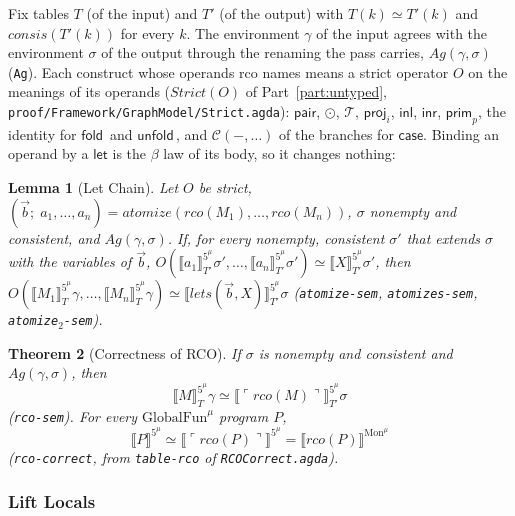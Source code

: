 \documentclass[10pt]{article}
\theoremstyle{acmplain}
\newtheorem{theorem}{Theorem}[section]
\newtheorem{lemma}[theorem]{Lemma}
\newcommand{\SEM}[1]{\llbracket #1 \rrbracket}
\newcommand{\key}[1]{\mathsf{#1}}
\newcommand{\pass}[1]{\mathit{#1}}
\newcommand{\consis}{\mathit{consis}}
\newcommand{\Tembed}[1]{\ulcorner #1 \urcorner}  %
\newcommand{\Ml}[1]{\textrm{#1}^{\mu}}                  %
\newcommand{\Mfold}{\key{fold}\,}
\newcommand{\Munfold}{\key{unfold}\,}
\begin{document}
Fix tables $T$ (of the input) and $T'$ (of the output) with
$T(k) \simeq T'(k)$ and $\consis(T'(k))$ for every $k$. The environment
$\gamma$ of the input agrees with the environment $\sigma$ of the output
through the renaming the pass carries, $\mathit{Ag}(\gamma, \sigma)$
(\texttt{Ag}). Each construct whose operands rco names means a strict
operator $O$ on the meanings of its operands ($\mathit{Strict}(O)$ of
Part~\ref{part:untyped}, \texttt{proof/Framework/GraphModel/Strict.agda}):
$\key{pair}$, $\odot$, $\mathcal{T}$, $\key{proj}_i$, $\key{inl}$,
$\key{inr}$, $\key{prim}_p$, the identity for $\Mfold$ and $\Munfold$, and
$\mathcal{C}(-, \ldots)$ of the branches for $\key{case}$. Binding an
operand by a $\key{let}$ is the $\beta$ law of its body, so it changes
nothing:
\begin{lemma}[Let Chain]\label{lem:m-den-let-chain}
Let $O$ be strict, $(\vec{b};\; a_1, \ldots, a_n) = \pass{atomize}(\pass{rco}(M_1), \ldots, \pass{rco}(M_n))$,
$\sigma$ nonempty and consistent, and $\mathit{Ag}(\gamma, \sigma)$.
If, for every nonempty, consistent $\sigma'$ that extends $\sigma$ with
the variables of $\vec{b}$,
$O(\SEM{a_1}^{\Ml{5}}_{T'}\sigma', \ldots, \SEM{a_n}^{\Ml{5}}_{T'}\sigma') \simeq \SEM{X}^{\Ml{5}}_{T'}\sigma'$, then
$O(\SEM{M_1}^{\Ml{5}}_{T}\gamma, \ldots, \SEM{M_n}^{\Ml{5}}_{T}\gamma) \simeq
  \SEM{\pass{lets}(\vec{b}, X)}^{\Ml{5}}_{T'}\sigma$
(\texttt{atomize-sem}, \texttt{atomizes-sem}, \texttt{atomize$_2$-sem}).
\end{lemma}
\begin{theorem}[Correctness of RCO]\label{thm:m-den-rco}
If $\sigma$ is nonempty and consistent and $\mathit{Ag}(\gamma, \sigma)$, then
\[ \SEM{M}^{\Ml{5}}_{T}\gamma \simeq \SEM{\Tembed{\pass{rco}(M)}}^{\Ml{5}}_{T'}\sigma \]
(\texttt{rco-sem}). For every $\Ml{GlobalFun}$ program $P$,
\[ \SEM{P}^{\Ml{5}} \simeq \SEM{\Tembed{\pass{rco}(P)}}^{\Ml{5}} = \SEM{\pass{rco}(P)}^{\Ml{Mon}} \]
(\texttt{rco-correct}, from \texttt{table-rco} of \texttt{RCOCorrect.agda}).
\end{theorem}

\subsubsection{Lift Locals}
\end{document}
